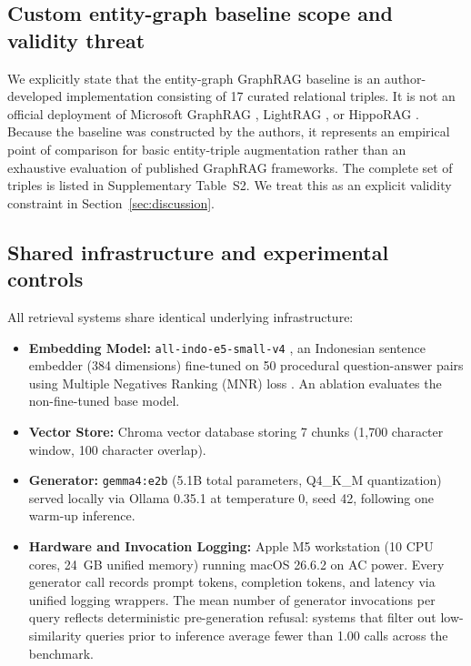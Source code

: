 \documentclass[preprint,10pt]{elsarticle}
\begin{document}
\subsection{Custom entity-graph baseline scope and validity threat}
We explicitly state that the entity-graph GraphRAG baseline is an author-developed implementation consisting of 17 curated relational triples. It is not an official deployment of Microsoft GraphRAG \cite{edge2024graphrag}, LightRAG \cite{guo2024lightrag}, or HippoRAG \cite{gutierrez2024hipporag}. Because the baseline was constructed by the authors, it represents an empirical point of comparison for basic entity-triple augmentation rather than an exhaustive evaluation of published GraphRAG frameworks. The complete set of triples is listed in Supplementary Table~S2. We treat this as an explicit validity constraint in Section~\ref{sec:discussion}.

\subsection{Shared infrastructure and experimental controls}
All retrieval systems share identical underlying infrastructure:
\begin{itemize}[leftmargin=*]
\item \textbf{Embedding Model:} \texttt{all-indo-e5-small-v4} \cite{lazarusnlp_e5}, an Indonesian sentence embedder (384 dimensions) fine-tuned on 50 procedural question-answer pairs using Multiple Negatives Ranking (MNR) loss \cite{henderson2017mnr}. An ablation evaluates the non-fine-tuned base model.
\item \textbf{Vector Store:} Chroma vector database storing 7 chunks (1,700 character window, 100 character overlap).
\item \textbf{Generator:} \texttt{gemma4:e2b} (5.1B total parameters, Q4\_K\_M quantization) served locally via Ollama 0.35.1 at temperature 0, seed 42, following one warm-up inference.
\item \textbf{Hardware and Invocation Logging:} Apple M5 workstation (10 CPU cores, 24~GB unified memory) running macOS 26.6.2 on AC power. Every generator call records prompt tokens, completion tokens, and latency via unified logging wrappers. The mean number of generator invocations per query reflects deterministic pre-generation refusal: systems that filter out low-similarity queries prior to inference average fewer than 1.00 calls across the benchmark.
\end{itemize}
\end{document}
